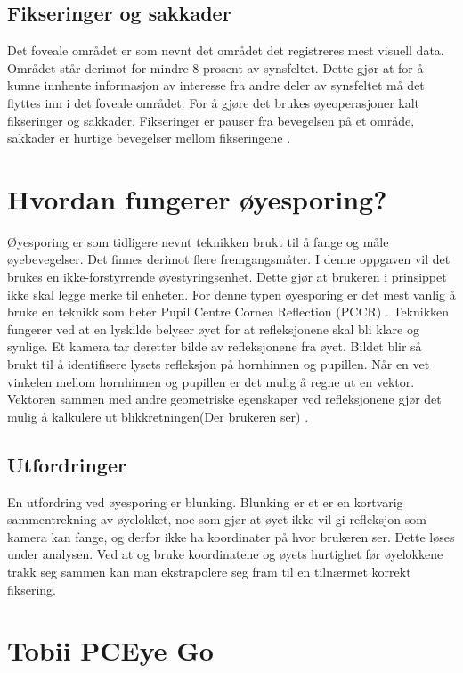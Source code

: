 \subsection{Fikseringer og sakkader}

Det foveale området er som nevnt det området det registreres mest visuell data. Området står derimot for mindre 8 prosent av synsfeltet. Dette gjør at for å kunne innhente informasjon av interesse fra andre deler av synsfeltet må det flyttes inn i  det foveale området. For å gjøre det brukes øyeoperasjoner kalt fikseringer og sakkader. Fikseringer er pauser fra bevegelsen på et område, sakkader er hurtige bevegelser mellom fikseringene \cite{Calibration}.


\section{Hvordan fungerer øyesporing?}

Øyesporing er som tidligere nevnt teknikken brukt til å fange og måle øyebevegelser.
Det finnes derimot flere fremgangsmåter. I denne oppgaven vil det brukes en ikke-forstyrrende øyestyringsenhet. Dette gjør at brukeren i prinsippet ikke skal legge merke til enheten. For denne typen øyesporing er det mest vanlig å bruke en teknikk som heter Pupil Centre Cornea Reflection (\gls{PCCR}) \cite{Calibration}. Teknikken fungerer ved at en lyskilde belyser øyet for at refleksjonene skal bli klare og synlige. Et kamera tar deretter bilde av refleksjonene fra øyet. Bildet blir så brukt til å identifisere lysets refleksjon på hornhinnen og pupillen. Når en vet vinkelen mellom hornhinnen og pupillen er det mulig å regne ut en vektor. Vektoren sammen med andre geometriske egenskaper ved refleksjonene gjør det mulig å kalkulere ut blikkretningen(Der brukeren ser) \cite{Calibration}.


\subsection{Utfordringer}

En utfordring ved øyesporing er blunking. Blunking er et er en kortvarig sammentrekning av øyelokket, noe som gjør at øyet ikke vil gi refleksjon som kamera kan fange, og derfor ikke ha koordinater på hvor brukeren ser. Dette løses under analysen. Ved at og bruke koordinatene og øyets hurtighet før øyelokkene trakk seg sammen kan man ekstrapolere seg fram til en tilnærmet korrekt fiksering. 

\section{Tobii PCEye Go}

